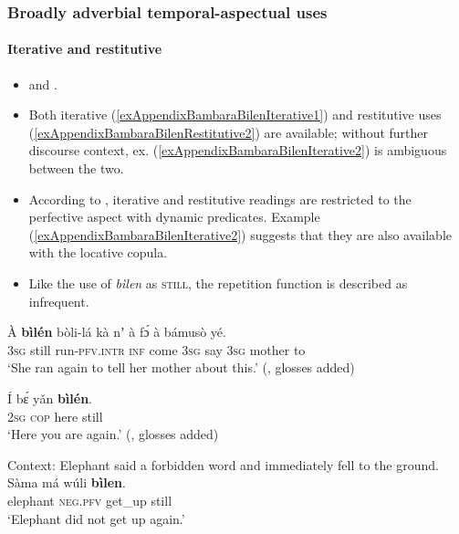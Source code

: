 \subsubsection{Broadly adverbial temporal-aspectual uses}
\paragraph{Iterative and restitutive}
\label{appendixBambaraBilenIterative}
\begin{itemize}
	\item \textcite{DombrowskyHahn2020} and \textcite[123]{Vydrine2015}.
	\item Both iterative (\ref{exAppendixBambaraBilenIterative1}) and restitutive uses (\ref{exAppendixBambaraBilenRestitutive2}) are available; without further discourse context, ex. (\ref{exAppendixBambaraBilenIterative2}) is ambiguous between the two.
		\item According to \textcite{DombrowskyHahn2020}, iterative and restitutive readings are restricted to the perfective aspect with dynamic predicates. Example (\ref{exAppendixBambaraBilenIterative2}) suggests that they are also available with the locative copula.
	\item Like the use of \textit{bìlen} as \textsc{still}, the repetition function is described as infrequent.
\end{itemize}
\begin{exe}
	\ex
	\label{exAppendixBambaraBilenIterative1}
	\gll À \textbf{bìlén} bòli-lá kà nʼ à fɔ́ à bámusò yé.\\
	3\textsc{sg} still run-\textsc{pfv}.\textsc{intr} \textsc{inf} come 3\textsc{sg} say 3\textsc{sg} mother to\\
	\glt \lq She ran again to tell her mother about this.\rq{ }(\cite[123]{Vydrine2015}, glosses added)

	\ex
	\label{exAppendixBambaraBilenIterative2}
	\gll Í bɛ́ yǎn \textbf{bìlén}.\\
	2\textsc{sg} \textsc{cop} here still\\
	\glt \lq Here you are again.' (\cite[123]{Vydrine2015}, glosses added)

	\ex \label{exAppendixBambaraBilenRestitutive2}
	Context: Elephant said a forbidden word and immediately fell to the ground.\\
	\gll Sàma má wúli \textbf{bìlen}.\\
	elephant \textsc{neg}.\textsc{pfv} get\_up still\\
	\glt \lq Elephant did not get up again.'  \parencite[121]{DombrowskyHahn2020}
\end{exe}


